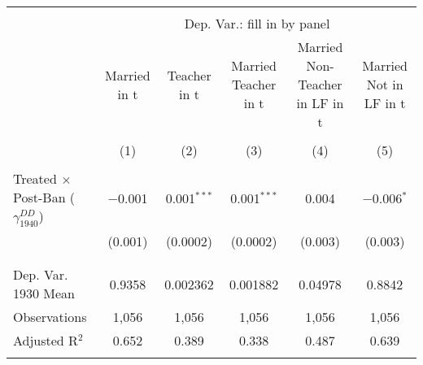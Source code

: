 
\begin{tabular}{@{\extracolsep{5pt}}lccccc} 
\\[-1.8ex]\hline 
\hline \\[-1.8ex] 
 & \multicolumn{5}{c}{Dep. Var.: fill in by panel} \\ 
\cline{2-6} 
 & Married in t & Teacher in t & Married Teacher in t & Married Non-Teacher in LF in t & Married Not in LF in t \\ 
\\[-1.8ex] & (1) & (2) & (3) & (4) & (5)\\ 
\hline \\[-1.8ex] 
 Treated $\times$ Post-Ban ($\gamma_{1940}^{DD}$) & $-$0.001 & 0.001$^{***}$ & 0.001$^{***}$ & 0.004 & $-$0.006$^{*}$ \\ 
  & (0.001) & (0.0002) & (0.0002) & (0.003) & (0.003) \\ 
  & & & & & \\ 
\hline \\[-1.8ex] 
Dep. Var. 1930 Mean & 0.9358 & 0.002362 & 0.001882 & 0.04978 & 0.8842 \\ 
Observations & 1,056 & 1,056 & 1,056 & 1,056 & 1,056 \\ 
Adjusted R$^{2}$ & 0.652 & 0.389 & 0.338 & 0.487 & 0.639 \\ 
\hline 
\hline \\[-1.8ex] 
\end{tabular} 
